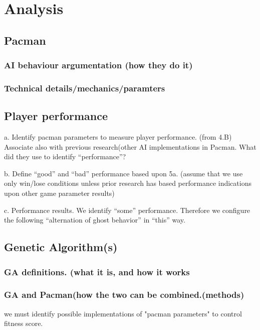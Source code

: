 \section{Analysis} \label{sec:analysis}




\subsection{Pacman}
\subsubsection{AI behaviour argumentation (how they do it)}
\subsubsection{Technical details/mechanics/paramters}

\subsection{Player performance}
a. Identify pacman parameters to measure player performance. (from 4.B) Associate also with  previous research(other AI implementations in Pacman. What did they use to  identify “performance”?


b. Define “good” and “bad” performance based upon 5a. (assume that we use only win/lose conditions unless prior research has based performance indications upon other game parameter results)

c. Performance results. We identify “some” performance. Therefore we configure the following “alternation of ghost behavior” in “this” way.

\subsection{Genetic Algorithm(s)}

\subsubsection{GA definitions. (what it is, and how it works}



\subsubsection{GA and Pacman(how the two can be combined.(methods)}
we must identify possible implementations of "pacman parameters" to control fitness score.
